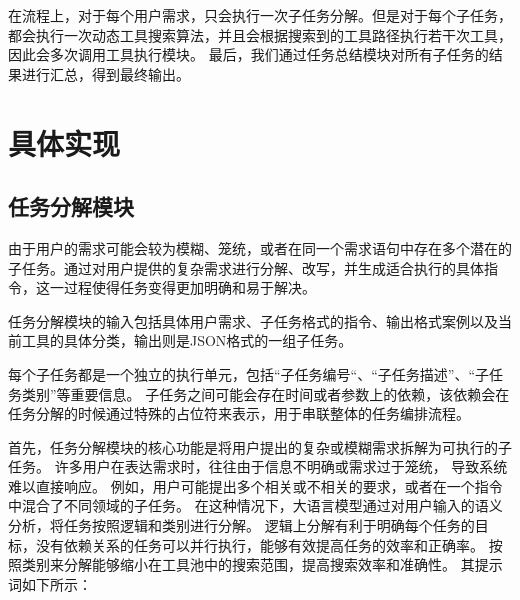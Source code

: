 在流程上，对于每个用户需求，只会执行一次子任务分解。但是对于每个子任务，都会执行一次动态工具搜索算法，并且会根据搜索到的工具路径执行若干次工具，因此会多次调用工具执行模块。
最后，我们通过任务总结模块对所有子任务的结果进行汇总，得到最终输出。

\section{具体实现}

\subsection{任务分解模块}

由于用户的需求可能会较为模糊、笼统，或者在同一个需求语句中存在多个潜在的子任务。通过对用户提供的复杂需求进行分解、改写，并生成适合执行的具体指令，这一过程使得任务变得更加明确和易于解决。

任务分解模块的输入包括具体用户需求、子任务格式的指令、输出格式案例以及当前工具的具体分类，输出则是JSON格式的一组子任务。

每个子任务都是一个独立的执行单元，包括“子任务编号“、“子任务描述”、“子任务类别”等重要信息。
子任务之间可能会存在时间或者参数上的依赖，该依赖会在任务分解的时候通过特殊的占位符来表示，用于串联整体的任务编排流程。

首先，任务分解模块的核心功能是将用户提出的复杂或模糊需求拆解为可执行的子任务。
许多用户在表达需求时，往往由于信息不明确或需求过于笼统，
导致系统难以直接响应。
例如，用户可能提出多个相关或不相关的要求，或者在一个指令中混合了不同领域的子任务。
在这种情况下，大语言模型通过对用户输入的语义分析，将任务按照逻辑和类别进行分解。
逻辑上分解有利于明确每个任务的目标，没有依赖关系的任务可以并行执行，能够有效提高任务的效率和正确率。
按照类别来分解能够缩小在工具池中的搜索范围，提高搜索效率和准确性。
其提示词如下所示：



